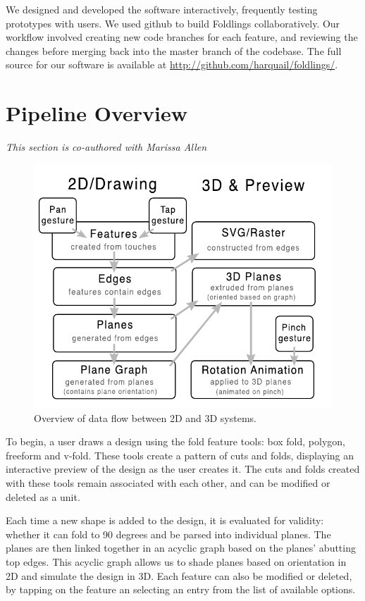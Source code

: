 We designed and developed the software interactively, frequently testing
prototypes with users. We used github to build Foldlings
collaboratively. Our workflow involved creating new code branches for
each feature, and reviewing the changes before merging back into the
master branch of the codebase. The full source for our software is
available at \url{http://github.com/harquail/foldlings/}.

\section{Pipeline Overview}\label{pipeline-overview}

\emph{This section is co-authored with Marissa Allen}

\begin{figure}[htbp]
\centering
\includegraphics{figures/shared/02_Overview/pipeline.pdf}
\caption{Overview of data flow between 2D and 3D systems.}
\end{figure}

To begin, a user draws a design using the fold feature tools: box fold,
polygon, freeform and v-fold. These tools create a pattern of cuts and
folds, displaying an interactive preview of the design as the user
creates it. The cuts and folds created with these tools remain
associated with each other, and can be modified or deleted as a unit.

Each time a new shape is added to the design, it is evaluated for
validity: whether it can fold to 90 degrees and be parsed into
individual planes. The planes are then linked together in an acyclic
graph based on the planes' abutting top edges. This acyclic graph allows
us to shade planes based on orientation in 2D and simulate the design in
3D. Each feature can also be modified or deleted, by tapping on the
feature an selecting an entry from the list of available options.


